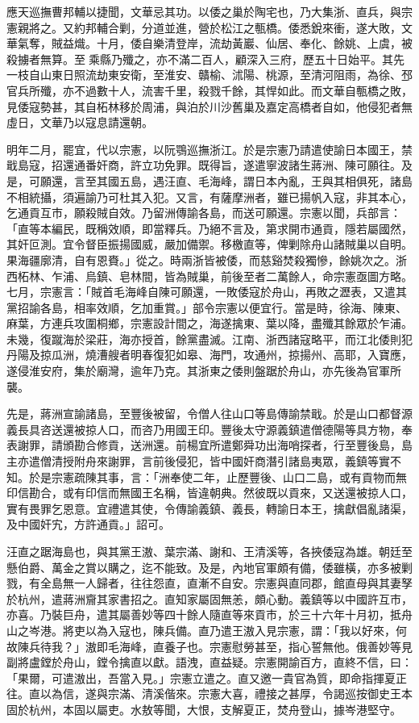 \begin{pinyinscope}
應天巡撫曹邦輔以捷聞，文華忌其功。以倭之巢於陶宅也，乃大集浙、直兵，與宗憲親將之。又約邦輔合剿，分道並進，營於松江之甎橋。倭悉銳來衝，遂大敗，文華氣奪，賊益熾。十月，倭自樂清登岸，流劫黃巖、仙居、奉化、餘姚、上虞，被殺擄者無算。至乘縣乃殲之，亦不滿二百人，顧深入三府，歷五十日始平。其先一枝自山東日照流劫東安衛，至淮安、贛榆、沭陽、桃源，至清河阻雨，為徐、邳官兵所殲，亦不過數十人，流害千里，殺戮千餘，其悍如此。而文華自甎橋之敗，見倭寇勢甚，其自柘林移於周浦，與泊於川沙舊巢及嘉定高橋者自如，他侵犯者無虛日，文華乃以寇息請還朝。

明年二月，罷宜，代以宗憲，以阮鶚巡撫浙江。於是宗憲乃請遣使諭日本國王，禁戢島寇，招還通番奸商，許立功免罪。既得旨，遂遣寧波諸生蔣洲、陳可願往。及是，可願還，言至其國五島，遇汪直、毛海峰，謂日本內亂，王與其相俱死，諸島不相統攝，須遍諭乃可杜其入犯。又言，有薩摩洲者，雖已揚帆入寇，非其本心，乞通貢互市，願殺賊自效。乃留洲傳諭各島，而送可願還。宗憲以聞，兵部言：「直等本編民，既稱效順，即當釋兵。乃絕不言及，第求開市通貢，隱若屬國然，其奸叵測。宜令督臣振揚國威，嚴加備禦。移檄直等，俾剿除舟山諸賊巢以自明。果海疆廓清，自有恩賚。」從之。時兩浙皆被倭，而慈谿焚殺獨慘，餘姚次之。浙西柘林、乍浦、烏鎮、皂林間，皆為賊巢，前後至者二萬餘人，命宗憲亟圖方略。七月，宗憲言：「賊首毛海峰自陳可願還，一敗倭寇於舟山，再敗之瀝表，又遣其黨招諭各島，相率效順，乞加重賞。」部令宗憲以便宜行。當是時，徐海、陳東、麻葉，方連兵攻圍桐鄉，宗憲設計間之，海遂擒東、葉以降，盡殲其餘眾於乍浦。未幾，復蹴海於梁莊，海亦授首，餘黨盡滅。江南、浙西諸寇略平，而江北倭則犯丹陽及掠瓜洲，燒漕艘者明春復犯如皋、海門，攻通州，掠揚州、高耶，入寶應，遂侵淮安府，集於廟灣，逾年乃克。其浙東之倭則盤踞於舟山，亦先後為官軍所襲。

先是，蔣洲宣諭諸島，至豐後被留，令僧人往山口等島傳諭禁戢。於是山口都督源義長具咨送還被掠人口，而咨乃用國王印。豐後太守源義鎮遣僧德陽等具方物，奉表謝罪，請頒勘合修貢，送洲還。前楊宜所遣鄭舜功出海哨探者，行至豐後島，島主亦遣僧清授附舟來謝罪，言前後侵犯，皆中國奸商潛引諸島夷眾，義鎮等實不知。於是宗憲疏陳其事，言：「洲奉使二年，止歷豐後、山口二島，或有貢物而無印信勘合，或有印信而無國王名稱，皆違朝典。然彼既以貢來，又送還被掠人口，實有畏罪乞恩意。宜禮遣其使，令傳諭義鎮、義長，轉諭日本王，擒獻倡亂諸渠，及中國奸宄，方許通貢。」詔可。

汪直之踞海島也，與其黨王滶、葉宗滿、謝和、王清溪等，各挾倭寇為雄。朝廷至懸伯爵、萬金之賞以購之，迄不能致。及是，內地官軍頗有備，倭雖橫，亦多被剿戮，有全島無一人歸者，往往怨直，直漸不自安。宗憲與直同郡，館直母與其妻孥於杭州，遣蔣洲齎其家書招之。直知家屬固無恙，頗心動。義鎮等以中國許互市，亦喜。乃裝巨舟，遣其屬善妙等四十餘人隨直等來貢市，於三十六年十月初，抵舟山之岑港。將吏以為入寇也，陳兵備。直乃遣王滶入見宗憲，謂：「我以好來，何故陳兵待我？」滶即毛海峰，直養子也。宗憲慰勞甚至，指心誓無他。俄善妙等見副將盧鏜於舟山，鏜令擒直以獻。語洩，直益疑。宗憲開諭百方，直終不信，曰：「果爾，可遣滶出，吾當入見。」宗憲立遣之。直又邀一貴官為質，即命指揮夏正往。直以為信，遂與宗滿、清溪偕來。宗憲大喜，禮接之甚厚，令謁巡按御史王本固於杭州，本固以屬吏。水敖等聞，大恨，支解夏正，焚舟登山，據岑港堅守。


\end{pinyinscope}
